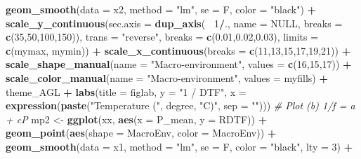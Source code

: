 \documentclass[
]{article}
\newenvironment{Shaded}{\begin{snugshade}}{\end{snugshade}}
\newcommand{\CommentTok}[1]{\textcolor[rgb]{0.56,0.35,0.01}{\textit{#1}}}
\newcommand{\DataTypeTok}[1]{\textcolor[rgb]{0.13,0.29,0.53}{#1}}
\newcommand{\DecValTok}[1]{\textcolor[rgb]{0.00,0.00,0.81}{#1}}
\newcommand{\FloatTok}[1]{\textcolor[rgb]{0.00,0.00,0.81}{#1}}
\newcommand{\KeywordTok}[1]{\textcolor[rgb]{0.13,0.29,0.53}{\textbf{#1}}}
\newcommand{\NormalTok}[1]{#1}
\newcommand{\OperatorTok}[1]{\textcolor[rgb]{0.81,0.36,0.00}{\textbf{#1}}}
\newcommand{\OtherTok}[1]{\textcolor[rgb]{0.56,0.35,0.01}{#1}}
\newcommand{\StringTok}[1]{\textcolor[rgb]{0.31,0.60,0.02}{#1}}
\begin{document}
\begin{Shaded}
\begin{Highlighting}[]
{{{{{\StringTok{    }\KeywordTok{geom_smooth}\NormalTok{(}\DataTypeTok{data =}\NormalTok{ x2, }\DataTypeTok{method =} \StringTok{"lm"}\NormalTok{, }\DataTypeTok{se =}\NormalTok{ F, }\DataTypeTok{color =} \StringTok{"black"}\NormalTok{) }\OperatorTok{+}
\StringTok{    }\KeywordTok{scale_y_continuous}\NormalTok{(}\DataTypeTok{sec.axis =} \KeywordTok{dup_axis}\NormalTok{(}\OperatorTok{~}\StringTok{ }\DecValTok{1}\OperatorTok{/}\NormalTok{., }\DataTypeTok{name =} \OtherTok{NULL}\NormalTok{, }\DataTypeTok{breaks =} \KeywordTok{c}\NormalTok{(}\DecValTok{35}\NormalTok{,}\DecValTok{50}\NormalTok{,}\DecValTok{100}\NormalTok{,}\DecValTok{150}\NormalTok{)),}
                       \DataTypeTok{trans =} \StringTok{"reverse"}\NormalTok{, }\DataTypeTok{breaks =} \KeywordTok{c}\NormalTok{(}\FloatTok{0.01}\NormalTok{,}\FloatTok{0.02}\NormalTok{,}\FloatTok{0.03}\NormalTok{), }
                       \DataTypeTok{limits =} \KeywordTok{c}\NormalTok{(mymax, mymin)) }\OperatorTok{+}
\StringTok{    }\KeywordTok{scale_x_continuous}\NormalTok{(}\DataTypeTok{breaks =} \KeywordTok{c}\NormalTok{(}\DecValTok{11}\NormalTok{,}\DecValTok{13}\NormalTok{,}\DecValTok{15}\NormalTok{,}\DecValTok{17}\NormalTok{,}\DecValTok{19}\NormalTok{,}\DecValTok{21}\NormalTok{)) }\OperatorTok{+}
\StringTok{    }\KeywordTok{scale_shape_manual}\NormalTok{(}\DataTypeTok{name =} \StringTok{"Macro-environment"}\NormalTok{, }\DataTypeTok{values =} \KeywordTok{c}\NormalTok{(}\DecValTok{16}\NormalTok{,}\DecValTok{15}\NormalTok{,}\DecValTok{17}\NormalTok{)) }\OperatorTok{+}
\StringTok{    }\KeywordTok{scale_color_manual}\NormalTok{(}\DataTypeTok{name =} \StringTok{"Macro-environment"}\NormalTok{, }\DataTypeTok{values =}\NormalTok{ myfills) }\OperatorTok{+}
\StringTok{    }\NormalTok{theme_AGL }\OperatorTok{+}\StringTok{ }
\StringTok{    }\KeywordTok{labs}\NormalTok{(}\DataTypeTok{title =}\NormalTok{ figlab, }\DataTypeTok{y =} \StringTok{"1 / DTF"}\NormalTok{, }
         \DataTypeTok{x =} \KeywordTok{expression}\NormalTok{(}\KeywordTok{paste}\NormalTok{(}\StringTok{"Temperature ("}\NormalTok{, degree, }\StringTok{"C)"}\NormalTok{, }\DataTypeTok{sep =} \StringTok{""}\NormalTok{)))}
  \CommentTok{# Plot (b) 1/f = a + cP}
\NormalTok{  mp2 <-}\StringTok{ }\KeywordTok{ggplot}\NormalTok{(xx, }\KeywordTok{aes}\NormalTok{(}\DataTypeTok{x =}\NormalTok{ P_mean, }\DataTypeTok{y =}\NormalTok{ RDTF)) }\OperatorTok{+}
\StringTok{    }\KeywordTok{geom_point}\NormalTok{(}\KeywordTok{aes}\NormalTok{(}\DataTypeTok{shape =}\NormalTok{ MacroEnv, }\DataTypeTok{color =}\NormalTok{ MacroEnv)) }\OperatorTok{+}
\StringTok{    }\KeywordTok{geom_smooth}\NormalTok{(}\DataTypeTok{data =}\NormalTok{ x1, }\DataTypeTok{method =} \StringTok{"lm"}\NormalTok{, }\DataTypeTok{se =}\NormalTok{ F, }\DataTypeTok{color =} \StringTok{"black"}\NormalTok{, }\DataTypeTok{lty =} \DecValTok{3}\NormalTok{) }\OperatorTok{+}
}}}}}
\end{Highlighting}
\end{Shaded}
\end{document}
